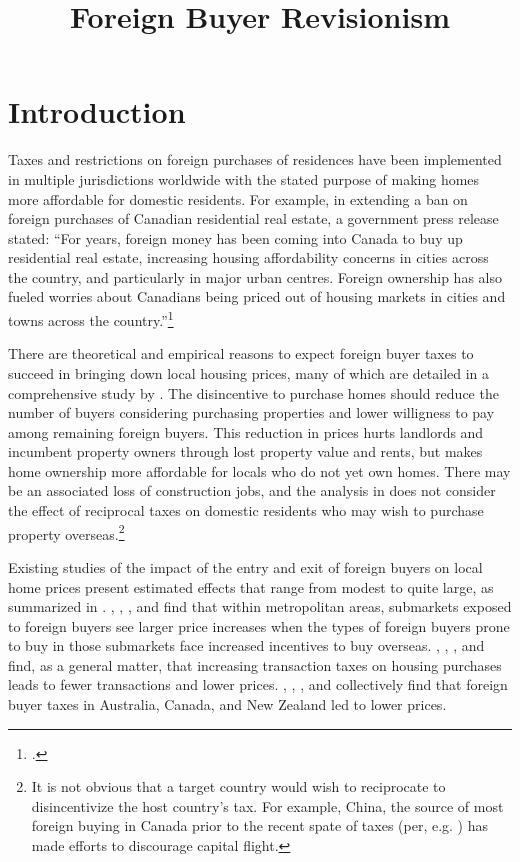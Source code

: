 \documentclass[12pt]{article}
\begin{document}
\title{Foreign Buyer Revisionism}

\section{Introduction}

Taxes and restrictions on foreign purchases of residences have been implemented
in multiple jurisdictions worldwide with the stated purpose of making homes
more affordable for domestic residents. For example, in extending a ban on
foreign purchases of Canadian residential real estate, a government press
release stated: ``For years, foreign money has been coming into Canada to buy
up residential real estate, increasing housing affordability concerns in cities
across the country, and particularly in major urban centres. Foreign ownership
has also fueled worries about Canadians being priced out of housing markets in
cities and towns across the country.''\footnote{\textcite{gOC}.}

There are theoretical and empirical reasons to expect foreign buyer taxes to
succeed in bringing down local housing prices, many of which are detailed in a
comprehensive study by \textcite{favilukisVanNieuwerburgh}. The disincentive to
purchase homes should reduce the number of buyers considering purchasing
properties and lower willigness to pay among remaining foreign buyers. This
reduction in prices hurts landlords and incumbent property owners through lost
property value and rents, but makes home ownership more affordable for locals
who do not yet own homes. There may be an associated loss of construction jobs,
and the analysis in \textcite{favilukisVanNieuwerburgh} does not consider the
effect of reciprocal taxes on domestic residents who may wish to purchase
property overseas.\footnote{It is not obvious that a target country would wish
	to reciprocate to disincentivize the host country's tax. For example,
	China, the source of most foreign buying in Canada prior to the recent
spate of taxes (per, e.g. \textcite{ctvNews}) has made efforts to discourage capital
flight.}

Existing studies of the impact of the entry and exit of foreign buyers on local home prices
present estimated effects that range from modest to quite large, as summarized
in \textcite{davidoffZheng}. \textcite{LiShenZhang},
\textcite{gorbackGlobalCapitalLocal2020}, \textcite{pavlovImmigrationFlows},
and \textcite{BadarinzaRamadorai} find that within metropolitan areas,
submarkets exposed to foreign buyers see larger price increases when the types
of foreign buyers prone to buy in those submarkets face increased incentives to
buy overseas. \textcite{DachisDurantonTurner}, \textcite{klevenBest},
\textcite{kopczukMunroe}, and \textcite{davidoffLeigh} find, as a general
matter, that increasing transaction taxes on housing purchases leads to fewer
transactions and lower prices. \textcite{HartleyForeign},
\textcite{andalfattoEstimatingEffectMetro2023}, \textcite{DuYinZhang}, and
\textcite{pavlovForeignBuyerTaxes} collectively find that foreign buyer taxes
in Australia, Canada, and New Zealand led to lower prices.
\end{document}

